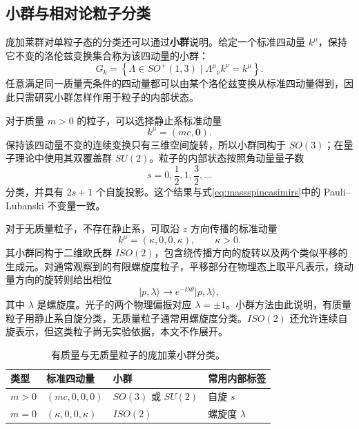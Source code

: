 \documentclass[style=classic,color=full]{lc-article}
\begin{document}
\subsection{小群与相对论粒子分类}

庞加莱群对单粒子态的分类还可以通过\textbf{小群}说明。给定一个标准四动量 $k^\mu$，保持它不变的洛伦兹变换集合称为该四动量的小群：
\begin{equation}
  G_k=\left\{\Lambda\in SO^+(1,3)
  \mid {\Lambda^\mu}_{\nu}k^\nu=k^\mu\right\}.
  \label{eq:littlegroupdefinition}
\end{equation}
任意满足同一质量壳条件的四动量都可以由某个洛伦兹变换从标准四动量得到，因此只需研究小群怎样作用于粒子的内部状态。

对于质量 $m>0$ 的粒子，可以选择静止系标准动量
\begin{equation}
  k^\mu=(mc,\bm0).
\end{equation}
保持该四动量不变的连续变换只有三维空间旋转，所以小群同构于 $SO(3)$；在量子理论中使用其双覆盖群 $SU(2)$。粒子的内部状态按照角动量量子数
\begin{equation}
  s=0,\frac12,1,\frac32,\ldots
\end{equation}
分类，并具有 $2s+1$ 个自旋投影。这个结果与式\eqref{eq:massspincasimirs}中的 Pauli--Lubanski 不变量一致。

对于无质量粒子，不存在静止系，可取沿 $z$ 方向传播的标准动量
\begin{equation}
  k^\mu=(\kappa,0,0,\kappa),
  \qquad \kappa>0.
\end{equation}
其小群同构于二维欧氏群 $ISO(2)$，包含绕传播方向的旋转以及两个类似平移的生成元。对通常观察到的有限螺旋度粒子，平移部分在物理态上取平凡表示，绕动量方向的旋转则给出相位
\begin{equation}
  \lvert p,\lambda\rangle
  \longrightarrow
  e^{-\ii\lambda\theta}\lvert p,\lambda\rangle,
  \label{eq:helicitytransformation}
\end{equation}
其中 $\lambda$ 是螺旋度。光子的两个物理偏振对应 $\lambda=\pm1$。小群方法由此说明，有质量粒子用静止系自旋分类，无质量粒子通常用螺旋度分类。$ISO(2)$ 还允许连续自旋表示，但这类粒子尚无实验依据，本文不作展开\cite{weinberg1995}。

\begin{table}[htbp]
  \centering
  \caption{有质量与无质量粒子的庞加莱小群分类。}
  \label{tab:littlegroupclassification}
  \begin{tabular}{llll}
    \toprule
    类型 & 标准四动量 & 小群 & 常用内部标签 \\
    \midrule
    $m>0$ & $(mc,0,0,0)$ & $SO(3)$ 或 $SU(2)$ & 自旋 $s$ \\
    $m=0$ & $(\kappa,0,0,\kappa)$ & $ISO(2)$ & 螺旋度 $\lambda$ \\
    \bottomrule
  \end{tabular}
\end{table}
\end{document}
